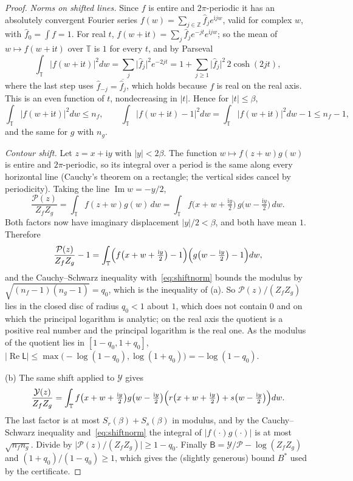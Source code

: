 \documentclass[11pt]{article}
\theoremstyle{definition}
\newcommand{\Z}{\mathbb Z}
\newcommand{\Tc}{\mathbb T}
\newcommand{\abs}[1]{\lvert #1\rvert}
\begin{document}
\begin{proof}
\emph{Norms on shifted lines.} Since $f$ is entire and $2\pi$-periodic it has an absolutely convergent Fourier
series $f(w)=\sum_{j\in\Z}\hat f_je^{\mathrm ijw}$, valid for complex $w$, with $\hat f_0=\int f=1$. For real $t$,
$f(w+\mathrm it)=\sum_j\hat f_je^{-jt}e^{\mathrm ijw}$; so the mean of $w\mapsto f(w+\mathrm it)$ over $\Tc$ is $1$
for every $t$, and by Parseval
\[
 \int_{\Tc}\abs{f(w+\mathrm it)}^2dw=\sum_j\abs{\hat f_j}^2e^{-2jt}=1+\sum_{j\ge1}\abs{\hat f_j}^2\,2\cosh(2jt),
\]
where the last step uses $\hat f_{-j}=\overline{\hat f_j}$, which holds because $f$ is real on the real axis. This
is an even function of $t$, nondecreasing in $\abs t$. Hence for $\abs t\le\beta$,
\begin{equation}\label{eq:shiftnorm}
 \int_{\Tc}\abs{f(w+\mathrm it)}^2dw\le n_f,\qquad\int_{\Tc}\abs{f(w+\mathrm it)-1}^2dw=\int_{\Tc}\abs{f(w+\mathrm it)}^2dw-1\le n_f-1,
\end{equation}
and the same for $g$ with $n_g$.

\emph{Contour shift.} Let $z=x+\mathrm iy$ with $\abs y<2\beta$. The function
$w\mapsto f(z+w)g(w)$ is entire and $2\pi$-periodic, so its integral over a period is the same along every
horizontal line (Cauchy's theorem on a rectangle; the vertical sides cancel by periodicity). Taking the line
$\operatorname{Im}w=-y/2$,
\[
 \frac{\mathcal P(z)}{Z_fZ_g}=\int_{\Tc}f(z+w)g(w)\,dw=\int_{\Tc}f\bigl(x+w+\tfrac{\mathrm iy}2\bigr)\,g\bigl(w-\tfrac{\mathrm iy}2\bigr)\,dw .
\]
Both factors now have imaginary displacement $\abs y/2<\beta$, and both have mean $1$. Therefore
\[
 \frac{\mathcal P(z)}{Z_fZ_g}-1=\int_{\Tc}\Bigl(f\bigl(x+w+\tfrac{\mathrm iy}2\bigr)-1\Bigr)\Bigl(g\bigl(w-\tfrac{\mathrm iy}2\bigr)-1\Bigr)dw,
\]
and the Cauchy--Schwarz inequality with~\eqref{eq:shiftnorm} bounds the modulus by
$\sqrt{(n_f-1)(n_g-1)}=q_0$, which is the inequality of (a). So $\mathcal P(z)/(Z_fZ_g)$ lies in the closed disc of radius $q_0<1$ about $1$, which
does not contain $0$ and on which the principal logarithm is analytic; on the real axis the quotient is a positive
real number and the principal logarithm is the real one. As the modulus of the quotient lies in $[1-q_0,1+q_0]$,
$\abs{\operatorname{Re}\mathsf L}\le\max\bigl(-\log(1-q_0),\log(1+q_0)\bigr)=-\log(1-q_0)$.

(b) The same shift applied to $\mathcal Y$ gives
\[
 \frac{\mathcal Y(z)}{Z_fZ_g}=\int_{\Tc}f\bigl(x+w+\tfrac{\mathrm iy}2\bigr)g\bigl(w-\tfrac{\mathrm iy}2\bigr)
 \Bigl(r\bigl(x+w+\tfrac{\mathrm iy}2\bigr)+s\bigl(w-\tfrac{\mathrm iy}2\bigr)\Bigr)dw .
\]
The last factor is at most $S_r(\beta)+S_s(\beta)$ in modulus, and by the Cauchy--Schwarz inequality
and~\eqref{eq:shiftnorm} the integral of $\abs{f(\cdot)g(\cdot)}$ is at most $\sqrt{n_fn_g}$. Divide by
$\abs{\mathcal P(z)/(Z_fZ_g)}\ge1-q_0$. Finally $\mathsf B=\mathcal Y/\mathcal P-\log(Z_fZ_g)$ and
$(1+q_0)/(1-q_0)\ge1$, which gives the (slightly generous) bound $B^\ast$ used by the certificate.


\end{proof}
\end{document}
